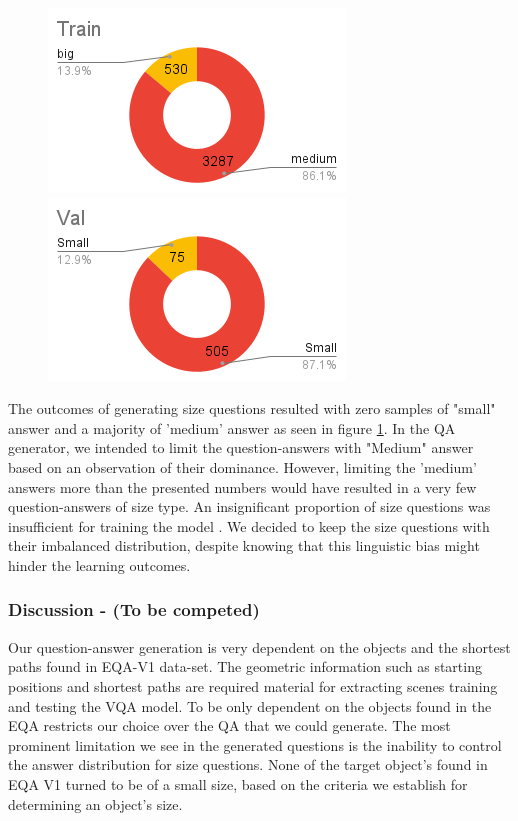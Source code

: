 \begin{figure}[H]
\includegraphics[scale=0.45]{latex/images/TrAnSi.png}
\includegraphics[scale=0.45]{latex/images/VlAnSi.png}
\caption{}
\label{fig:AnsDist}
\end{figure}

The outcomes of generating size questions resulted with zero samples of "small" answer and a majority of 'medium' answer as seen in figure \ref{fig:AnsDist}. In the QA generator, we intended to limit the question-answers with "Medium" answer based on an observation of their dominance. However, limiting the 'medium' answers more than the presented numbers would have resulted in a very few question-answers of size type. An insignificant proportion of size questions was insufficient for training the model . We decided to keep the size questions with their imbalanced distribution, despite knowing that this linguistic bias might hinder the learning outcomes.  

\subsubsection{Discussion - (To be competed)}

Our question-answer generation is very dependent on the objects and the shortest paths found in EQA-V1 data-set. The geometric information such as  starting positions and shortest paths are required material for extracting scenes training and testing the VQA model. To be only dependent on the objects found in the EQA restricts our choice over the QA that we could generate. The most prominent limitation we see in the generated questions is the inability to control the answer distribution for size questions. None of the target object's found in EQA V1 turned to be of a small size, based on the criteria we establish for determining an object's size. 

